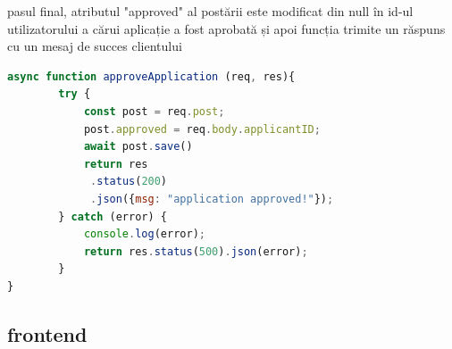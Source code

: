 \documentclass[12pt,a4paper,hidelinks]{report}
\theoremstyle{definition}
\theoremstyle{remark}
\begin{document}
    pasul final, atributul "approved" al postării este modificat din null în id-ul utilizatorului a cărui aplicație a fost aprobată
    și apoi funcția trimite un răspuns cu un mesaj de succes clientului
    \begin{lstlisting}[language=Javascript]
        async function approveApplication (req, res){
        try {
            const post = req.post;
            post.approved = req.body.applicantID;
            await post.save()
            return res
             .status(200)
             .json({msg: "application approved!"});
        } catch (error) {
            console.log(error);
            return res.status(500).json(error);
        }
}
    \end{lstlisting}
\subsection{frontend}
\end{document}
